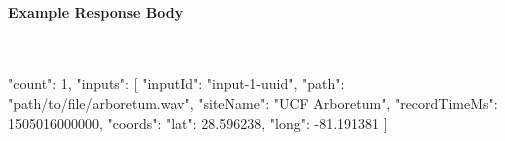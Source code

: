 \paragraph{Example Response Body} \mbox{}\\[\codeheaderspace]
\begin{jsoncode}
{
  "count": 1,
  "inputs": [
    {
      "inputId": "input-1-uuid",
      "path": "path/to/file/arboretum.wav",
      "siteName": "UCF Arboretum",
      "recordTimeMs": 1505016000000,
      "coords": {
        "lat": 28.596238,
        "long": -81.191381
      }
    }
  ]
}
\end{jsoncode}
